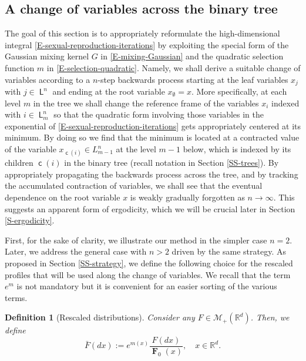 \documentclass[reqno]{amsart}
\newtheorem{definition}{Definition}[section]
\DeclareMathOperator{\Leaves}{\mathsf{L}}
\DeclareMathOperator{\Level}{\mathsf{L}}
\DeclareMathOperator{\child}{\mathsf{c}}
\DeclareMathOperator{\bF}{\boldsymbol{F}}
\numberwithin{equation}{section}
\begin{document}
{\subsection{A change of variables across the binary tree}
The goal of this section is to appropriately reformulate the high-dimensional integral \eqref{E-sexual-reproduction-iterations} by exploiting the special form of the Gaussian mixing kernel $G$ in \eqref{E-mixing-Gaussian} and the quadratic selection function $m$ in \eqref{E-selection-quadratic}. Namely, we shall derive a suitable change of variables according to a $n$-step backwards process starting at the leaf variables $x_j$ with $j\in \Leaves^n$ and ending at the root variable $x_\emptyset=x$. More specifically, at each level $m$ in the tree we shall change the reference frame of the variables $x_i$ indexed with $i\in \Level^n_m$ so that the quadratic form involving those variables in the exponential of \eqref{E-sexual-reproduction-iterations} gets appropriately centered at its minimum. By doing so we find that the minimum is located at a contracted value of the variable $x_{\child(i)}\in L^n_{m-1}$ at the level $m-1$ below, which is indexed by its children $\child(i)$ in the binary tree (recall notation in Section \ref{SS-trees}). By appropriately propagating the backwards process across the tree, and by tracking the accumulated contraction of variables, we shall see that the eventual dependence on the root variable $x$ is weakly gradually forgotten as $n\rightarrow \infty$. This suggests an apparent form of ergodicity, which we will be crucial later in Section \ref{S-ergodicity}. 

First, for the sake of clarity, we illustrate our method in the simpler case $n=2$. Later, we address the general case with $n>2$ driven by the same strategy. As proposed in Section \ref{SS-strategy}, we define the following choice for the rescaled profiles that will be used along the change of variables. We recall that the term $e^m$ is not mandatory but it is convenient for an easier sorting of the various terms.

\begin{definition}[Rescaled distributions]\label{D-rescaled-F}
Consider any $F\in \mathcal{M}_+(\mathbb{R}^d)$. Then, we define
$$
\bar{F}(dx):=e^{m(x)} \frac{F(dx)}{\bF_0(x)},\quad x\in \mathbb{R}^d.
$$
\end{definition}

}
\end{document}
